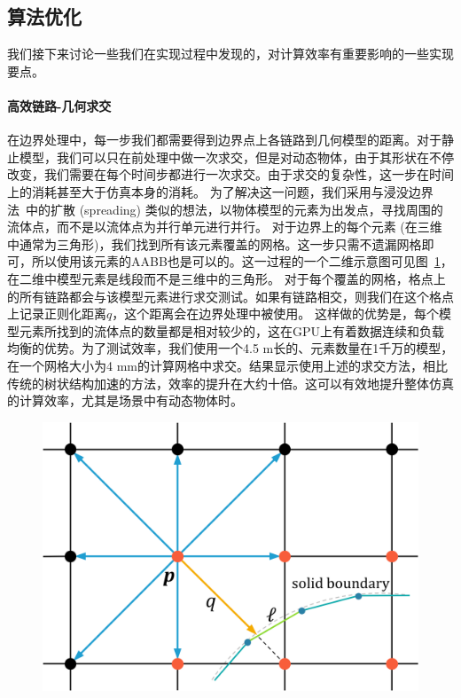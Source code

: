 \subsection{算法优化}
我们接下来讨论一些我们在实现过程中发现的，对计算效率有重要影响的一些实现要点。

\paragraph{高效链路-几何求交}
在边界处理中，每一步我们都需要得到边界点上各链路到几何模型的距离。对于静止模型，我们可以只在前处理中做一次求交，但是对动态物体，由于其形状在不停改变，我们需要在每个时间步都进行一次求交。由于求交的复杂性，这一步在时间上的消耗甚至大于仿真本身的消耗。
为了解决这一问题，我们采用与浸没边界法~\cite{Chen-2021}中的扩散 (spreading) 类似的想法，以物体模型的元素为出发点，寻找周围的流体点，而不是以流体点为并行单元进行并行。
对于边界上的每个元素 (在三维中通常为三角形)，我们找到所有该元素覆盖的网格。这一步只需不遗漏网格即可，所以使用该元素的AABB也是可以的。这一过程的一个二维示意图可见图~\ref{img:intersection}，在二维中模型元素是线段而不是三维中的三角形。
对于每个覆盖的网格，格点上的所有链路都会与该模型元素进行求交测试。如果有链路相交，则我们在这个格点上记录正则化距离$q$，这个距离会在边界处理中被使用。
这样做的优势是，每个模型元素所找到的流体点的数量都是相对较少的，这在GPU上有着数据连续和负载均衡的优势。为了测试效率，我们使用一个4.5 m长的、元素数量在1千万的模型，在一个网格大小为4 mm的计算网格中求交。结果显示使用上述的求交方法，相比传统的树状结构加速的方法，效率的提升在大约十倍。这可以有效地提升整体仿真的计算效率，尤其是场景中有动态物体时。

\begin{figure}[htb]
  \centering
    \includegraphics[width=0.7\columnwidth]{figures/intersection.png}
  \label{img:intersection}
\end{figure}

